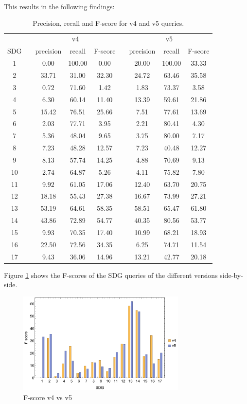 \documentclass{article}
\begin{document}
This results in the following findings:

\begin{table}[H]
\centering 
\begin{tabular}{c c ccc c ccc}
\toprule
&&\multicolumn{3}{c}{v4}&&\multicolumn{3}{c}{v5}\\
\cline{3-5} \cline{7-9}
SDG && precision & recall & F-score && precision & recall & F-score \\
 \hline
 1 && 0.00 & 100.00 & 0.00 && 20.00 & 100.00 & 33.33 \\
 2 && 33.71 & 31.00 & 32.30 && 24.72 & 63.46 & 35.58 \\
 3 && 0.72 & 71.60 & 1.42 && 1.83 & 73.37 & 3.58 \\
 4 && 6.30 & 60.14 & 11.40 && 13.39 & 59.61 & 21.86 \\
 5 && 15.42 & 76.51 & 25.66 && 7.51 & 77.61 & 13.69 \\
 6 && 2.03 & 77.71 & 3.95 && 2.21 & 80.41 & 4.30 \\
 7 && 5.36 & 48.04 & 9.65 && 3.75 & 80.00 & 7.17 \\
 8 && 7.23 & 48.28 & 12.57 && 7.23 & 40.48 & 12.27 \\
 9 && 8.13 & 57.74 & 14.25 && 4.88 & 70.69 & 9.13 \\
 10 && 2.74 & 64.87 & 5.26 && 4.11 & 75.82 & 7.80 \\
 11 && 9.92 & 61.05 & 17.06 && 12.40 & 63.70 & 20.75 \\
 12 && 18.18 & 55.43 & 27.38 && 16.67 & 73.99 & 27.21 \\
 13 && 53.19 & 64.61 & 58.35 && 58.51 & 65.47 & 61.80 \\
 14 && 43.86 & 72.89 & 54.77 && 40.35 & 80.56 & 53.77 \\
 15 && 9.93 & 70.35 & 17.40 && 10.99 & 68.21 & 18.93 \\
 16 && 22.50 & 72.56 & 34.35 && 6.25 & 74.71 & 11.54 \\
 17 && 9.43 & 36.06 & 14.96 && 13.21 & 42.77 & 20.18 \\
 \bottomrule
\end{tabular}
\caption{Precision, recall and F-score for v4 and v5 queries.}
\label{precisiondatatab}
\end{table}

Figure \ref{f1barchart} shows the F-scores of the SDG queries of the different versions side-by-side. 
\begin{figure}[H]
	\centering
  \includegraphics[width=0.75\textwidth]{figures/f1barchart.pdf}
	\caption{F-score v4 vs v5}
	\label{f1barchart}
\end{figure}
\end{document}

